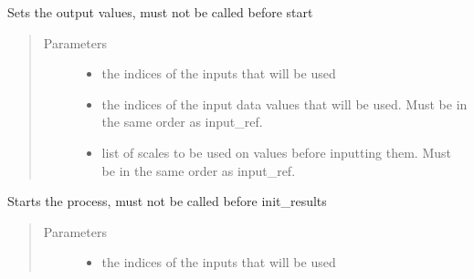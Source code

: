 \documentclass[letterpaper,10pt,english]{sphinxmanual}
\begin{document}
\begin{fulllineitems}
\begin{fulllineitems}
\end{fulllineitems}


\begin{fulllineitems}
\label{\detokenize{src.processors:src.processors.models.Processor.set_outputs}}
Sets the output values, must not be called before start
\begin{quote}\begin{description}
\item[{Parameters}] \leavevmode\begin{itemize}
\item {} 
 \textendash{} the indices of the inputs that will be used

\item {} 
 \textendash{} the indices of the input data values that will be used.
Must be in the same order as input\_ref.

\item {} 
 \textendash{} list of scales to be used on values before inputting them.
Must be in the same order as input\_ref.

\end{itemize}

\end{description}\end{quote}

\end{fulllineitems}


\begin{fulllineitems}
\label{\detokenize{src.processors:src.processors.models.Processor.start}}
Starts the process, must not be called before init\_results
\begin{quote}\begin{description}
\item[{Parameters}] \leavevmode\begin{itemize}
\item {} 
 \textendash{} the indices of the inputs that will be used


\end{itemize}
\end{description}
\end{quote}
\end{fulllineitems}
\end{fulllineitems}
\end{document}

